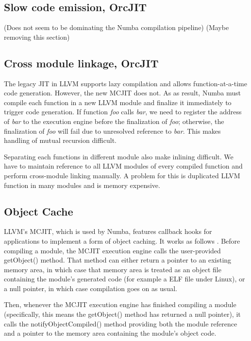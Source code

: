 \documentclass{acm_proc_article-sp}
\begin{document}
\subsection{Slow code emission, OrcJIT}

(Does not seem to be dominating the Numba compilation pipeline)
(Maybe removing this section)

\subsection{Cross module linkage, OrcJIT}

The legacy JIT in LLVM supports lazy compilation and allows function-at-a-time
code generation.  However, the new MCJIT does not. As as result, Numba must
compile each function in a new LLVM module and finalize it immediately to
trigger code generation. If function \textit{foo} calls \textit{bar},
we need to register the address of \textit{bar} to the execution engine
before the finalization of \textit{foo}; otherwise, the finalization of
\textit{foo} will fail due to unresolved reference to \textit{bar}.
This makes handling of mutual recursion difficult.

Separating each functions in different module also make inlining difficult.
We have to maintain reference to all LLVM modules of every compiled function
and perform cross-module linking manually. A problem for this is duplicated
LLVM function in many modules and is memory expensive.

\subsection{Object Cache}

LLVM's MCJIT, which is used by Numba, features callback hooks for
applications to implement a form of object caching.  It works
as follows \cite{llvmdoc:objectcache}.
Before compiling a module, the MCJIT execution engine
calls the user-provided getObject() method.  That method can either
return a pointer to an existing memory area, in which case that
memory area is treated as an object file containing the module's
generated code (for example a ELF file under Linux), or a null pointer,
in which case compilation goes on as usual.

Then, whenever the MCJIT execution engine has finished compiling a
module (specifically, this means the getObject() method has returned
a null pointer), it calls the notifyObjectCompiled() method providing
both the module reference and a pointer to the memory area containing
the module's object code.
\end{document}
